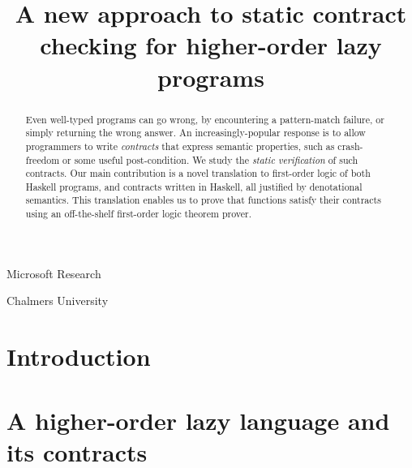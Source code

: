 \documentclass[preprint,nocopyrightspace]{sigplanconf}
\begin{document}
\renewcommand{\Th}{{\cal T}}

\newcommand{\theLang}{\lambda_{\sf HALO}}

\newcommand{\trc}[1]{{\cal C}\{\!\!\{#1\}\!\!\}}
\newcommand{\trs}[2]{{\cal S}^{#1}\{\!\!\{#2\}\!\!\}}

\title{A new approach to static contract checking for higher-order lazy programs}

           {Microsoft Research}{}

           {Chalmers University}{}
\maketitle
\makeatactive

\begin{abstract}
Even well-typed programs can go wrong, by encountering a pattern-match
failure, or simply returning the wrong answer.  An
increasingly-popular response is to allow programmers to write
\emph{contracts} that express semantic properties, such as
crash-freedom or some useful post-condition.
We study the \emph{static verification} of such contracts.
Our main contribution is a novel translation to first-order logic
of both Haskell programs, and contracts written in Haskell,
all justified by denotational semantics. This translation enables us to prove
that functions satisfy their contracts using an off-the-shelf first-order logic
theorem prover.
\end{abstract}

\section{Introduction}\label{s:intro}
  


\section{A higher-order lazy language and its contracts}\label{sect:language}
  
\end{document}
